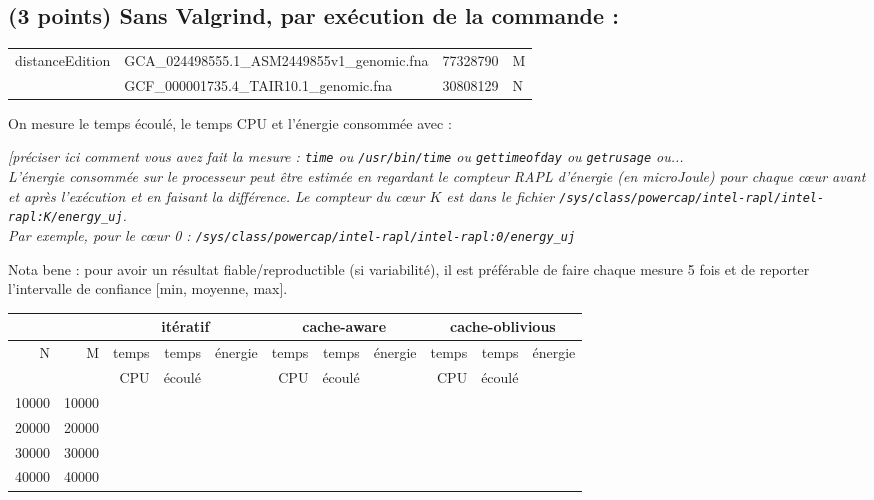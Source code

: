 \documentclass[10pt,a4paper]{article}
\begin{document}
{\subsection{(3 points) Sans Valgrind, par exécution de la commande :}
{\tt \begin{tabular}{llll}
distanceEdition & GCA\_024498555.1\_ASM2449855v1\_genomic.fna & 77328790 & M \\
                & GCF\_000001735.4\_TAIR10.1\_genomic.fna     & 30808129 & N
\end{tabular}}

On mesure le temps écoulé, le temps CPU et l'énergie consommée avec : {\em [préciser ici comment vous avez fait la mesure :
{\tt time} 
ou {\tt /usr/bin/time}
ou {\tt gettimeofday}
ou {\tt getrusage}
ou... \\
L'énergie consommée sur le processeur peut être estimée en regardant le compteur RAPL d'énergie (en microJoule)
pour chaque cœur avant et après l'exécution et en faisant la différence.
Le compteur du cœur $K$ est dans le fichier \verb+/sys/class/powercap/intel-rapl/intel-rapl:K/energy_uj+.\\
Par exemple, pour le cœur 0 : \verb+/sys/class/powercap/intel-rapl/intel-rapl:0/energy_uj+

Nota bene : pour avoir un résultat fiable/reproductible (si variabilité), 
il est préférable de faire chaque mesure 5 fois et de reporter l'intervalle
de confiance [min, moyenne, max].

\begin{tabular}{|r|r||r|r|r||r|r|r||r|r|r||}
\hline
 \multicolumn{2}{|c||}{ } 
& \multicolumn{3}{c||}{itératif}
& \multicolumn{3}{c||}{cache-aware}
& \multicolumn{3}{c||}{cache-oblivious}
\\ \hline
N & M 
& temps   & temps & énergie       %
& temps   & temps & énergie       %
& temps   & temps & énergie       %
\\
& 
& CPU     & écoulé&               %
& CPU     & écoulé&               %
& CPU     & écoulé&               %
\\ \hline
\hline
10000 & 10000 
&  &  &   %
&  &  &   %
&  &  &   %
\\ \hline
20000 & 20000 
&  &  &   %
&  &  &   %
&  &  &   %
\\ \hline
30000 & 30000 
&  &  &   %
&  &  &   %
&  &  &   %
\\ \hline
40000 & 40000 
&  &  &   %
&  &  &   %
&  &  &   %
\\ \hline
\hline
\end{tabular}

}}
\end{document}
